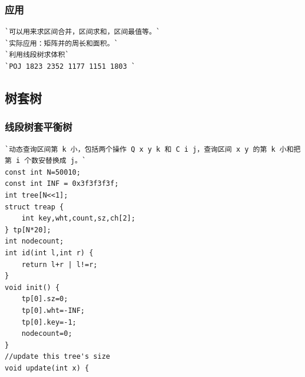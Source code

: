 \documentclass[a4paper]{article}
\begin{document}
\begin{CJK*}{UTF8}{gbsn}
\begin{multicols}{3}
\begin{flushleft}
\subsubsection{应用}
\begin{lstlisting}
`可以用来求区间合并，区间求和，区间最值等。`
`实际应用：矩阵并的周长和面积。`
`利用线段树求体积`
`POJ 1823 2352 1177 1151 1803 `
\end{lstlisting}




\subsection{树套树}


\subsubsection{线段树套平衡树}
\begin{lstlisting}
`动态查询区间第 k 小，包括两个操作 Q x y k 和 C i j，查询区间 x y 的第 k 小和把第 i 个数安替换成 j。`
const int N=50010;
const int INF = 0x3f3f3f3f;
int tree[N<<1];
struct treap {
    int key,wht,count,sz,ch[2];
} tp[N*20];
int nodecount;
int id(int l,int r) {
    return l+r | l!=r;
}
void init() {
    tp[0].sz=0;
    tp[0].wht=-INF;
    tp[0].key=-1;
    nodecount=0;
}
//update this tree's size
void update(int x) {
 

\end{lstlisting}
\end{flushleft}
\end{multicols}
\end{CJK*}
\end{document}
